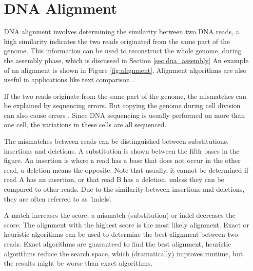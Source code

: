 \documentclass[../main/thesis.tex]{subfiles}
\begin{document}

\section{DNA Alignment}
DNA alignment involves determining the similarity between two DNA reads, a high similarity indicates the two reads originated from the same part of the genome.
This information can be used to reconstruct the whole genome, during the assembly phase, which is discussed in Section \ref{sec:dna_assembly}
An example of an alignment is shown in Figure \ref{fig:alignment}.
Alignment algorithms are also useful in applications like text comparison \cite{SW_plagiarism}.


If the two reads originate from the same part of the genome, the mismatches can be explained by sequencing errors.
But copying the genome during cell division can also cause errors \cite{dna_replication_errors}.
Since DNA sequencing is usually performed on more than one cell, the variations in these cells are all sequenced.

The mismatches between reads can be distinguished between substitutions, insertions and deletions.
A substitution is shown between the fifth bases in the figure.
An insertion is where a read has a base that does not occur in the other read, a deletion means the opposite.
Note that usually, it cannot be determined if read A has an insertion, or that read B has a deletion, unless they can be compared to other reads.
Due to the similarity between insertions and deletions, they are often referred to as 'indels'.

A match increases the score, a mismatch (substitution) or indel decreases the score.
The alignment with the highest score is the most likely alignment.
Exact or heuristic algorithms can be used to determine the best alignment between two reads.
Exact algorithms are guaranteed to find the best alignment, heuristic algorithms reduce the search space, which (dramatically) improves runtime, but the results might be worse than exact algorithms.
\end{document}
